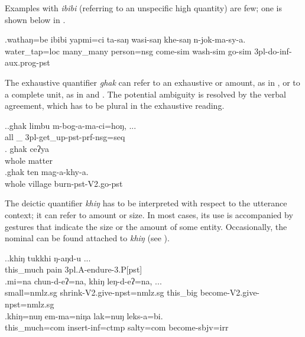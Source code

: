 Examples with \emph{ibibi} (referring to an unspecific high quantity) are few; one is shown below in \Next.

\exg.wathaŋ=be      ibibi     yapmi=ci     ta-saŋ        wasi-saŋ        khe-saŋ        n-jok-ma-sy-a.\\
water\_tap{\sc =loc} many\_many person{\sc =nsg} come{\sc -sim} wash{\sc -sim} go{\sc -sim} {\sc 3pl-}do{\sc -inf-aux.prog-pst}\\
 

The exhaustive quantifier \emph{ghak}  can refer to an exhaustive  or amount, as in  \Next[a], or to a complete unit, as in \Next[b] and  \Next[c]. The potential ambiguity is resolved by the verbal  agreement, which has to be plural in the exhaustive reading.

\ex.\ag.ghak limbu          m-bog-a-ma-ci=hoŋ, ...\\
all \_ {\sc 3pl-}get\_up{\sc -pst-prf-nsg=seq}\\
  
\bg. ghak  ceʔya \\
whole matter\\
  
\bg.ghak ten     mag-a-khy-a.\\
whole village burn{\sc [3sg]-pst-V2.go-pst}\\
  

The deictic quantifier \emph{khiŋ} has to be interpreted with respect to the utterance context; it can  refer to  amount or size. In most cases, its use is accompanied by  gestures that indicate the size or the amount of some entity. Occasionally,  the nominal  can be found attached to \emph{khiŋ}  (see \Next[c]).

\ex.\ag.khiŋ     tukkhi ŋ-aŋd-u ...\\
this\_much pain {\sc 3pl.A-}endure{\sc -3.P[pst]}\\
  
\bg.mi=na  chun-d-eʔ=na,   khiŋ    leŋ-d-eʔ=na, ... \\
small{\sc =nmlz.sg} shrink{\sc [3sg]-V2.give-npst=nmlz.sg} this\_big become{\sc [3sg]-V2.give-npst=nmlz.sg}\\
  
\bg.khiŋ=nuŋ em-ma=niŋa lak=nuŋ leks-a=bi.\\
this\_much{\sc =com} insert{\sc -inf=ctmp} salty{\sc =com} become{\sc [3sg]-sbjv=irr}\\

